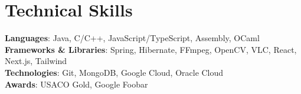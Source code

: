 \documentclass[letterpaper,11pt]{article}
\begin{document}
%
    \section{Technical Skills}
    \begin{itemize}[leftmargin=0.15in, label={}]
    \small{\item{
        \textbf{Languages}{: Java, C/C++, JavaScript/TypeScript, Assembly, OCaml} \\
        \textbf{Frameworks \& Libraries}{: Spring, Hibernate, FFmpeg, OpenCV, VLC, React, Next.js, Tailwind} \\
        \textbf{Technologies}{: Git, MongoDB, Google Cloud, Oracle Cloud} \\
        \textbf{Awards}{: USACO Gold, Google Foobar}
    }}
    \end{itemize}


\end{document}
